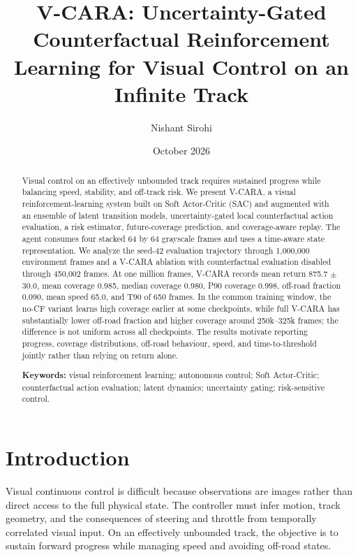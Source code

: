 \documentclass[11pt]{article}
\title{V-CARA: Uncertainty-Gated Counterfactual Reinforcement Learning for Visual Control on an Infinite Track}
\author{Nishant Sirohi}
\date{October 2026}
\begin{document}
\maketitle


\begin{abstract}

Visual control on an effectively unbounded track requires sustained
progress while balancing speed, stability, and off-track risk. We
present V-CARA, a visual reinforcement-learning system built on Soft
Actor-Critic (SAC) and augmented with an ensemble of latent transition
models, uncertainty-gated local counterfactual action evaluation, a risk
estimator, future-coverage prediction, and coverage-aware replay. The
agent consumes four stacked 64 by 64 grayscale frames and uses a
time-aware state representation. We analyze the seed-42
evaluation trajectory through 1,000,000 environment frames and a V-CARA
ablation with counterfactual evaluation disabled through 450,002 frames.
At one million frames, V-CARA records mean return 875.7 \(\pm\) 30.0,
mean coverage 0.985, median coverage 0.980, P90 coverage 0.998, off-road
fraction 0.090, mean speed 65.0, and T90 of 650 frames. In the common
training window, the no-CF variant learns high coverage earlier at some
checkpoints, while full V-CARA has substantially lower off-road fraction
and higher coverage around 250k--325k frames; the difference is not
uniform across all checkpoints. The results motivate reporting progress,
coverage distributions, off-road behaviour, speed, and time-to-threshold
jointly rather than relying on return alone.

\textbf{Keywords:} visual reinforcement learning; autonomous control;
Soft Actor-Critic; counterfactual action evaluation; latent dynamics;
uncertainty gating; risk-sensitive control.

\end{abstract}
\section{Introduction}\label{introduction}

Visual continuous control is difficult because observations are images
rather than direct access to the full physical state. The controller
must infer motion, track geometry, and the consequences of steering and
throttle from temporally correlated visual input. On an effectively
unbounded track, the objective is to sustain forward progress while
managing speed and avoiding off-road states.
\end{document}
